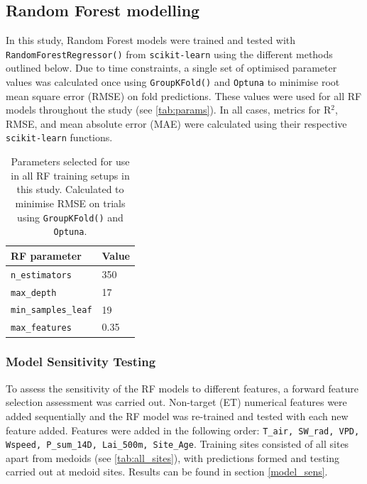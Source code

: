 \subsection{Random Forest modelling}
In this study, Random Forest models were trained and tested with \texttt{RandomForestRegressor()} from \texttt{scikit-learn} \parencite{pedregosa2011scikit} using the different methods outlined below. Due to time constraints, a single set of optimised parameter values was calculated once using \texttt{GroupKFold()} and \texttt{Optuna} \parencite{akiba2019optuna} to minimise root mean square error (RMSE) on fold predictions. These values were used for all RF models throughout the study (see \autoref{tab:params}). In all cases, metrics for R$^2$, RMSE, and mean absolute error (MAE) were calculated using their respective \texttt{scikit-learn} functions.


\begin{table}[H]
	\caption{Parameters selected for use in all RF training setups in this study. Calculated to minimise RMSE on trials using \texttt{GroupKFold()} and \texttt{Optuna}.}
	\centering
	\begin{tabularx}{0.5\linewidth}{l l}
		\toprule
		RF parameter & Value \\
		\midrule
		\texttt{n\_estimators} & 350 \\
		\texttt{max\_depth} & 17 \\
		\texttt{min\_samples\_leaf} & 19 \\
		\texttt{max\_features} & 0.35  \\
	\end{tabularx}
	\label{tab:params}
\end{table}



\subsubsection{Model Sensitivity Testing}
To assess the sensitivity of the RF models to different features, a forward feature selection assessment was carried out. Non-target (ET) numerical features were added sequentially and the RF model was re-trained and tested with each new feature added. Features were added in the following order: \texttt{T\_air, SW\_rad, VPD, Wspeed, P\_sum\_14D, Lai\_500m, Site\_Age}. Training sites consisted of all sites apart from medoids (see \autoref{tab:all_sites}), with predictions formed and testing carried out at medoid sites. Results can be found in section \ref{model_sens}.


